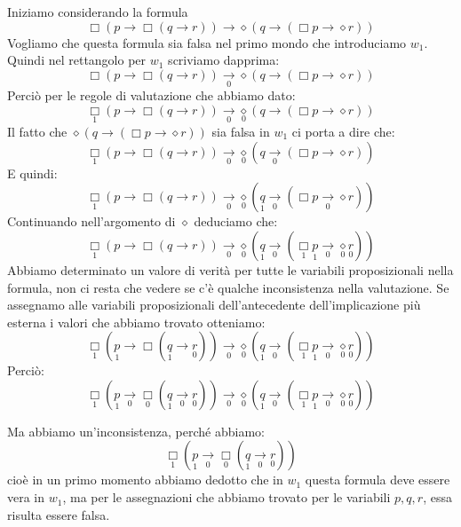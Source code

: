 \documentclass[a4paper, titlepage, 12pt]{report}
\begin{document}
Iniziamo considerando la formula
$$\Box(p \rightarrow \Box(q \rightarrow r)) \rightarrow \diamond(q \rightarrow (\Box p \rightarrow \diamond r))$$
Vogliamo che questa formula sia falsa nel primo mondo che introduciamo $w_1$.
Quindi nel rettangolo per $w_1$ scriviamo dapprima:
$$\Box(p \rightarrow \Box(q \rightarrow r)) \underset{0}{\rightarrow} \diamond(q \rightarrow (\Box p \rightarrow \diamond r))$$
Perciò per le regole di valutazione che abbiamo dato:
$$\underset{1}{\Box}(p \rightarrow \Box(q \rightarrow r)) \underset{0}{\rightarrow} \underset{0}\diamond(q \rightarrow (\Box p \rightarrow \diamond r))$$
Il fatto che $\diamond(q \rightarrow (\Box p \rightarrow \diamond r))$ sia falsa in $w_1$ ci porta a dire che:
$$\underset{1}{\Box}(p \rightarrow \Box(q \rightarrow r)) \underset{0}{\rightarrow} \underset{0}\diamond(q \underset{0}{\rightarrow} (\Box p \rightarrow \diamond r))$$
E quindi:
$$\underset{1}{\Box}(p \rightarrow \Box(q \rightarrow r)) \underset{0}{\rightarrow} \underset{0}\diamond(\underset{1}{q} \underset{0}{\rightarrow} (\Box p \underset{0}{\rightarrow} \diamond r))$$
Continuando nell'argomento di $\diamond$ deduciamo che:
$$\underset{1}{\Box}(p \rightarrow \Box(q \rightarrow r)) \underset{0}{\rightarrow} \underset{0}\diamond(\underset{1}{q} \underset{0}{\rightarrow} (\underset{1}{\Box} \underset{1}{p} \underset{0}{\rightarrow} \underset{0}{\diamond} \underset{0}{r}))$$
Abbiamo determinato un valore di verità per tutte le variabili proposizionali nella formula, non ci resta che vedere se c'è qualche inconsistenza nella valutazione.
Se assegnamo alle variabili proposizionali dell'antecedente dell'implicazione più esterna i valori
che abbiamo trovato otteniamo:
$$\underset{1}{\Box}(\underset{1}{p} \rightarrow \Box(\underset{1}{q} \rightarrow \underset{0}{r})) \underset{0}{\rightarrow} \underset{0}\diamond(\underset{1}{q} \underset{0}{\rightarrow} (\underset{1}{\Box} \underset{1}{p} \underset{0}{\rightarrow} \underset{0}{\diamond} \underset{0}{r}))$$
Perciò:
$$\underset{1}{\Box}(\underset{1}{p} \underset{0}{\rightarrow} \underset{0}{\Box}(\underset{1}{q} \underset{0}{\rightarrow} \underset{0}{r})) \underset{0}{\rightarrow} \underset{0}\diamond(\underset{1}{q} \underset{0}{\rightarrow} (\underset{1}{\Box} \underset{1}{p} \underset{0}{\rightarrow} \underset{0}{\diamond} \underset{0}{r}))$$

Ma abbiamo un'inconsistenza, perché abbiamo:
$$\underset{1}{\Box}(\underset{1}{p} \underset{0}{\rightarrow}\underset{0}{\Box}(\underset{1}{q} \underset{0}{\rightarrow} \underset{0}{r}))$$
cioè in un primo momento abbiamo dedotto che in $w_1$ questa formula deve essere vera in $w_1$,
ma per le assegnazioni che abbiamo trovato per le variabili $p, q, r$, essa risulta essere falsa.
\end{document}
